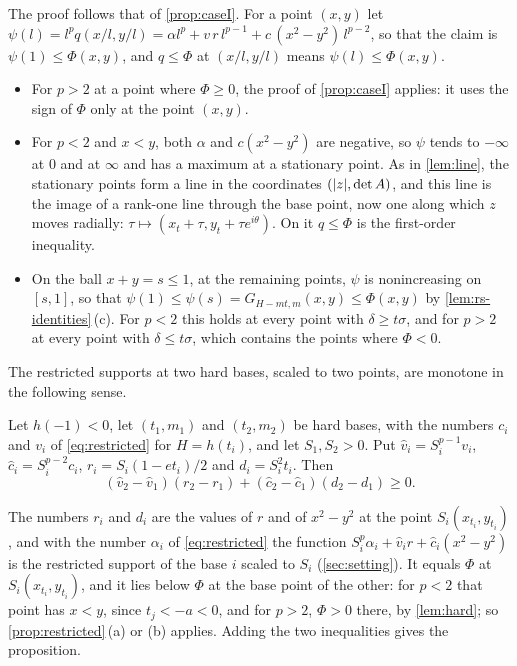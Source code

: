 The proof follows that of \cref{prop:caseI}. For a point $(x,y)$ let
$\psi(l)=l^pq(x/l,y/l)=\alpha l^p+v\,r\,l^{p-1}+c\,(x^2-y^2)\,l^{p-2}$, so that the claim is
$\psi(1)\le\Phi(x,y)$, and $q\le\Phi$ at $(x/l,y/l)$ means $\psi(l)\le\Phi(x,y)$.
\begin{itemize}
\item For $p>2$ at a point where $\Phi\ge0$, the proof of \cref{prop:caseI} applies: it uses
  the sign of $\Phi$ only at the point $(x,y)$.
\item For $p<2$ and $x<y$, both $\alpha$ and $c(x^2-y^2)$ are negative, so $\psi$ tends to
  $-\infty$ at $0$ and at $\infty$ and has a maximum at a stationary point. As in
  \cref{lem:line}, the stationary points form a line in the coordinates $(\lvert z\rvert,\det A)$, and
  this line is the image of a rank-one line through the base point, now one along which $z$
  moves radially: $\tau\mapsto(x_t+\tau,y_t+\tau e^{i\theta})$. On it $q\le\Phi$ is the
  first-order inequality.
\item On the ball $x+y=s\le1$, at the remaining points, $\psi$ is nonincreasing on $[s,1]$, so
  that $\psi(1)\le\psi(s)=G_{H-mt,m}(x,y)\le\Phi(x,y)$ by \cref{lem:rs-identities}\,(c). For
  $p<2$ this holds at every point with $\delta\ge t\sigma$, and for $p>2$ at every point with
  $\delta\le t\sigma$, which contains the points where $\Phi<0$.
\end{itemize}

The restricted supports at two hard bases, scaled to two points, are monotone in the following
sense.

\begin{proposition}\label{prop:monotone}
Let $h(-1)<0$, let $(t_1,m_1)$ and $(t_2,m_2)$ be hard bases, with the numbers $c_i$ and $v_i$
of \eqref{eq:restricted} for $H=h(t_i)$, and let $S_1,S_2>0$. Put
$\hat v_i=S_i^{p-1}v_i$, $\hat c_i=S_i^{p-2}c_i$, $r_i=S_i(1-et_i)/2$ and $d_i=S_i^2t_i$. Then
\[
  (\hat v_2-\hat v_1)(r_2-r_1)+(\hat c_2-\hat c_1)(d_2-d_1)\ge0 .
\]
\end{proposition}

The numbers $r_i$ and $d_i$ are the values of $r$ and of $x^2-y^2$ at the point
$S_i(x_{t_i},y_{t_i})$, and with the number $\alpha_i$ of \eqref{eq:restricted} the function
$S_i^p\alpha_i+\hat v_ir+\hat c_i(x^2-y^2)$ is the restricted support of the base $i$ scaled to
$S_i$ (\cref{sec:setting}). It equals $\Phi$ at
$S_i(x_{t_i},y_{t_i})$, and it lies below $\Phi$ at the base point of the other: for $p<2$ that
point has $x<y$, since $t_j<-a<0$, and for $p>2$, $\Phi>0$ there, by \cref{lem:hard}; so
\cref{prop:restricted}\,(a) or (b) applies. Adding the two inequalities gives the proposition.

